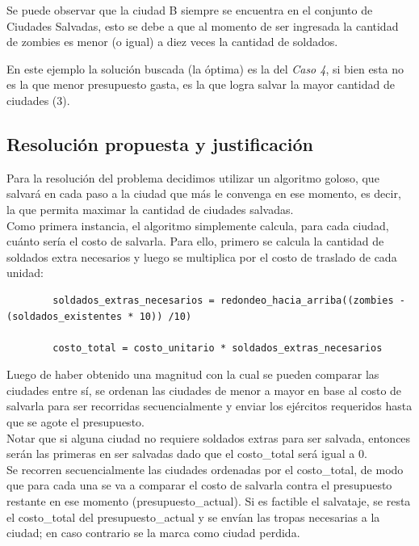 Se puede observar que la ciudad B siempre se encuentra en el conjunto de Ciudades Salvadas, esto se debe a que al momento de ser ingresada la cantidad de zombies es menor (o igual) a diez veces la cantidad de soldados. 

En este ejemplo la soluci\'on buscada (la \'optima) es la del \emph{Caso 4}, si bien esta no es la que menor presupuesto gasta, es la que logra salvar la mayor cantidad de ciudades (3).

\newpage
\subsection{Resoluci\'on propuesta y justificaci\'on}

Para la resoluci\'on del problema decidimos utilizar un algoritmo goloso, que salvar\'a en cada paso a la ciudad que m\'as le convenga en ese momento, es decir, la que permita maximar la cantidad de ciudades salvadas.\\

Como primera instancia, el algoritmo simplemente calcula, para cada ciudad, cu\'anto ser\'ia el costo de salvarla. Para ello, primero se calcula la cantidad de soldados extra necesarios y luego se multiplica por el costo de traslado de cada unidad:\\


	\begin{codesnippet}
	\begin{verbatim}
		soldados_extras_necesarios = redondeo_hacia_arriba((zombies - (soldados_existentes * 10)) /10)
		
		costo_total = costo_unitario * soldados_extras_necesarios
	\end{verbatim}
	\end{codesnippet}

Luego de haber obtenido una magnitud con la cual se pueden comparar las ciudades entre s\'i, se ordenan las ciudades de menor a mayor en base al costo de salvarla para ser recorridas secuencialmente y enviar los ej\'ercitos requeridos hasta que se agote el presupuesto.\\

Notar que si alguna ciudad no requiere soldados extras para ser salvada, entonces ser\'an las primeras en ser salvadas dado que el costo_total ser\'a igual a 0.\\
 
Se recorren secuencialmente las ciudades ordenadas por el costo_total, de modo que para cada una se va a comparar el costo de salvarla contra el presupuesto restante en ese momento (presupuesto_actual). Si es factible el salvataje, se resta el costo_total del presupuesto_actual y se env\'ian las tropas necesarias a la ciudad; en caso contrario se la marca como ciudad perdida.\\

